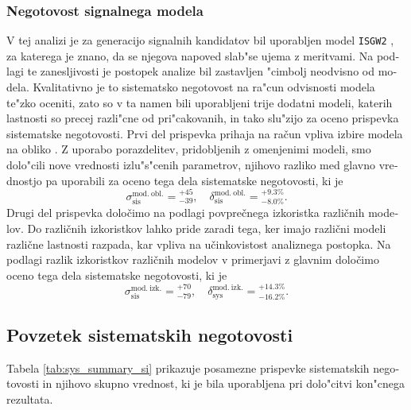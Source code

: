 \begin{otherlanguage}{slovene}
\subsubsection{Negotovost signalnega modela}
V tej analizi je za generacijo signalnih kandidatov bil uporabljen model \texttt{ISGW2} \cite{Scora:1995ty}, za katerega je znano, da se njegova napoved slab"se ujema z meritvami. Na podlagi te zanesljivosti je postopek analize bil zastavljen "cimbolj neodvisno od modela. Kvalitativno je to sistematsko negotovost na ra"cun odvisnosti modela te"zko oceniti, zato so v ta namen bili uporabljeni trije dodatni modeli, katerih lastnosti so precej razli"cne od pri"cakovanih, in tako slu"zijo za oceno prispevka sistematske negotovosti. Prvi del prispevka prihaja na račun vpliva izbire modela na obliko \varss. Z uporabo porazdelitev, pridobljenih z omenjenimi modeli, smo dolo"cili nove vrednosti izlu"s"cenih parametrov, njihovo razliko med glavno vrednostjo pa uporabili za oceno tega dela sistematske negotovosti, ki je
\begin{equation}
\sigma_{\mathrm{sis}}^{\mathrm{mod.~obl.}} = {}^{+45}_{-39},\quad \delta_{\mathrm{sis}}^{\mathrm{mod.~obl.}} = {}^{+9.3\%}_{-8.0\%}.
\end{equation}
Drugi del prispevka določimo na podlagi povprečnega izkoristka različnih modelov. Do različnih izkoristkov lahko pride zaradi tega, ker imajo različni modeli različne lastnosti razpada, kar vpliva na učinkovistost analiznega postopka. Na podlagi razlik izkoristkov različnih modelov v primerjavi z glavnim določimo oceno tega dela sistematske negotovosti, ki je
\begin{equation}
\sigma_{\mathrm{sis}}^{\mathrm{mod.~izk.}} = {}^{+70}_{-79},\quad \delta_{\mathrm{sys}}^{\mathrm{mod.~izk.}} = {}^{+14.3\%}_{-16.2\%}.
\end{equation}
\subsection{Povzetek sistematskih negotovosti}

Tabela \ref{tab:sys_summary_si} prikazuje posamezne prispevke sistematskih negotovosti in njihovo skupno vrednost, ki je bila uporabljena pri dolo"citvi kon"cnega rezultata.


\end{otherlanguage}
